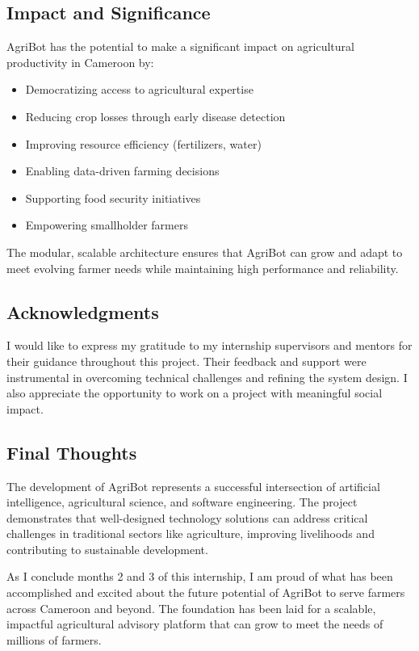 \documentclass[12pt,a4paper]{article}
\begin{document}
\subsection{Impact and Significance}

AgriBot has the potential to make a significant impact on agricultural productivity in Cameroon by:

\begin{itemize}[leftmargin=*]
    \item Democratizing access to agricultural expertise
    \item Reducing crop losses through early disease detection
    \item Improving resource efficiency (fertilizers, water)
    \item Enabling data-driven farming decisions
    \item Supporting food security initiatives
    \item Empowering smallholder farmers
\end{itemize}

The modular, scalable architecture ensures that AgriBot can grow and adapt to meet evolving farmer needs while maintaining high performance and reliability.

\subsection{Acknowledgments}

I would like to express my gratitude to my internship supervisors and mentors for their guidance throughout this project. Their feedback and support were instrumental in overcoming technical challenges and refining the system design. I also appreciate the opportunity to work on a project with meaningful social impact.

\subsection{Final Thoughts}

The development of AgriBot represents a successful intersection of artificial intelligence, agricultural science, and software engineering. The project demonstrates that well-designed technology solutions can address critical challenges in traditional sectors like agriculture, improving livelihoods and contributing to sustainable development.

As I conclude months 2 and 3 of this internship, I am proud of what has been accomplished and excited about the future potential of AgriBot to serve farmers across Cameroon and beyond. The foundation has been laid for a scalable, impactful agricultural advisory platform that can grow to meet the needs of millions of farmers.
\end{document}
